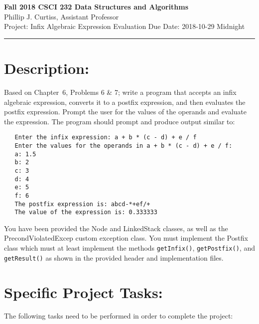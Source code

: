 \documentclass[10pt]{article}
\begin{document}
\thispagestyle{firststyle}
\pagestyle{plain}

\begin{flushleft}
	{\bfseries{}Fall 2018 CSCI 232 Data Structures and Algorithms} \\
	{Phillip J. Curtiss, Assistant Professor} \\[1em]
	{Project: Infix Algebraic Expression Evaluation} \hfill {Due Date: 2018-10-29 Midnight} \\
	\hrule
\end{flushleft}

\section*{Description:}

Based on Chapter~6, Problems 6 \& 7; write a program that accepts an infix algebraic expression, converts it to a postfix expression, and then evaluates the postfix expression. Prompt the user for the values of the operands and evaluate the expression. The program should prompt and produce output similar to:

\begin{verbatim}
   Enter the infix expression: a + b * (c - d) + e / f
   Enter the values for the operands in a + b * (c - d) + e / f:
   a: 1.5
   b: 2
   c: 3
   d: 4
   e: 5
   f: 6
   The postfix expression is: abcd-*+ef/+
   The value of the expression is: 0.333333
\end{verbatim}

You have been provided the Node and LinkedStack classes, as well as the PrecondViolatedExcep custom exception class. You must implement the Postfix class which must at least implement the methods \verb|getInfix()|, \verb|getPostfix()|, and \verb|getResult()| as shown in the provided header and implementation files. 



\section*{Specific Project Tasks:}

The following tasks need to be performed in order to complete the project:

\newcommand{\tab}{\hspace{3em}}
\end{document}
